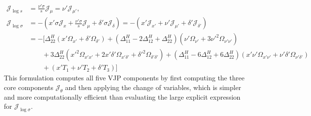 \documentclass{article}
\begin{document}
\begin{align}
  \mathcal{J}_{\log s}      & = \frac{\nu' \sigma}{s} \mathcal{J}_{\mu} = \nu' \mathcal{J}_{\mu'},                                                                                                                                                                           \\
  \mathcal{J}_{\log \sigma} & = - \left( x' \sigma \mathcal{J}_x + \frac{\nu' \sigma}{s} \mathcal{J}_\mu + \delta' \sigma \mathcal{J}_\delta \right) = - (x' \mathcal{J}_{x'} + \nu' \mathcal{J}_{\mu'} + \delta' \mathcal{J}_{\delta'}) \nonumber                           \\
                            & = - \Big[ \Delta^H_{22} (x' \Omega_{x'} + \delta' \Omega_{\delta'}) + (\Delta^H_{11} - 2\Delta^H_{12} + \Delta^H_{22}) (\nu' \Omega_{\nu'} + 3 \nu'^2 \Omega_{\nu'\nu'}) \nonumber                                                             \\
                            & \qquad + 3 \Delta^H_{22} (x'^2 \Omega_{x'x'} + 2 x'\delta' \Omega_{x'\delta'} + \delta'^2 \Omega_{\delta'\delta'}) + (\Delta^H_{11} - 6\Delta^H_{12} + 6\Delta^H_{22}) (x' \nu' \Omega_{x'\nu'} + \nu' \delta' \Omega_{\nu'\delta'}) \nonumber \\
                            & \qquad + (x' T_1 + \nu' T_2 + \delta' T_3) \Big]
\end{align}
%
This formulation computes all five VJP components by first computing the three core components $\mathcal{J}_{\theta}$ and then applying the change of variables, which is simpler and more computationally efficient than evaluating the large explicit expression for $\mathcal{J}_{\log \sigma}$.
\end{document}
